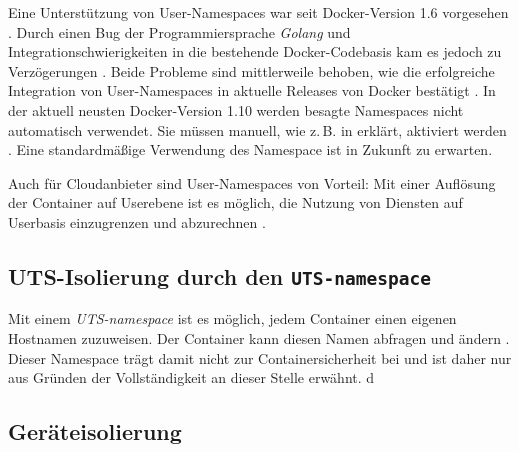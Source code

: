 \documentclass[../main.tex]{subfiles}
\begin{document}
			Eine Unterstützung von User-Namespaces war seit Docker-Version 1.6 vorgesehen \cite{githubUserNamespaceProposal}. Durch einen Bug der Programmiersprache \emph{Golang} und Integrationschwierigkeiten in die bestehende Docker-Codebasis kam es jedoch zu Verzögerungen \cite{nsUserGolangBug}\cite{githubUserNamespaceConflict}\cite{githubUserNamespaceIntegration}. Beide Probleme sind mittlerweile behoben, wie die erfolgreiche Integration von User-Namespaces in aktuelle Releases von Docker bestätigt \cite{githubUserNamespaceIntegration}. In der aktuell neusten Docker-Version 1.10 werden besagte Namespaces nicht automatisch verwendet. Sie müssen manuell, wie z.\,B. in \cite{nsUserEnable} erklärt, aktiviert werden \cite{githubDockerChangelog}. Eine standardmäßige Verwendung des Namespace ist in Zukunft zu erwarten.





			Auch für Cloudanbieter sind User-Namespaces von Vorteil: Mit einer Auflösung der Container auf Userebene ist es möglich, die Nutzung von Diensten auf Userbasis einzugrenzen und abzurechnen \cite[S.3]{nsUserContainerCon}.

		\subsection{\acrshort{UTS}-Isolierung durch den \texttt{\acrshort{UTS}-namespace}}
			Mit einem \emph{\acrshort{UTS}-namespace} ist es möglich, jedem Container einen eigenen Hostnamen zuzuweisen. Der Container kann diesen Namen abfragen und ändern \cite[S.3]{virtVSContainer}. Dieser Namespace trägt damit nicht zur Containersicherheit bei und ist daher nur aus Gründen der Vollständigkeit an dieser Stelle erwähnt.
d
		\subsection{Geräteisolierung}
\end{document}
